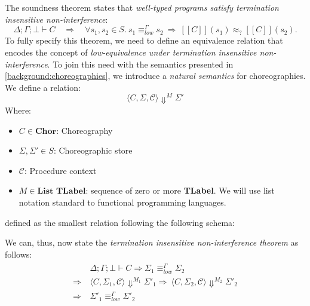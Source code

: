 \documentclass[12pt,a4paper,twoside]{book}
\newcommand{\llbracket}{[\![}
\newcommand{\rrbracket}{]\!]}
\begin{document}
The soundness theorem states that \emph{well-typed programs satisfy termination insensitive non-interference}:
\[
  \Delta;\Gamma;\bot \vdash C
  \quad\Longrightarrow\quad
  \forall s_1,s_2 \in S.\ s_1 \equiv^\Gamma_{low} s_2 \ \Rightarrow\ \llbracket C \rrbracket(s_1) \approx_? \llbracket C \rrbracket(s_2).
\]
To fully specify this theorem, we need to define an equivalence relation that encodes the concept of \emph{low-equivalence under termination insensitive non-interference}.
To join this need with the semantics presented in \ref{background:choreographies}, we introduce a \emph{natural semantics}\cite{kahn1987natural} for choreographies. We define a relation:
\begin{equation}\label{nat_sem}
\langle C, \Sigma, \mathscr{C} \rangle \Downarrow^M \Sigma'
\end{equation}
Where:
\begin{itemize}
	\item $C \in \textbf{Chor}$: Choreography
	\item $\Sigma, \Sigma' \in S$: Choreographic store
	\item $\mathscr{C}$: Procedure context
	\item $M \in \textbf{List TLabel}$: sequence of zero or more \textbf{TLabel}. We will use list notation standard to functional programming languages.
\end{itemize}
defined as the smallest relation following the following schema:

We can, thus, now state the \emph{termination insensitive non-interference theorem} as follows:
\begin{align} \label{main:def}
\begin{split}
	&\Delta;\Gamma;\bot \vdash C \Rightarrow
	\Sigma_1 \equiv^\Gamma_{low} \Sigma_2 \\ \Rightarrow\ &\langle C, \Sigma_1, \mathscr{C}\rangle \Downarrow^{M_1} \Sigma'_1
	\Rightarrow\ \langle C, \Sigma_2, \mathscr{C}\rangle \Downarrow^{M_2} \Sigma'_2 \\ \Rightarrow\ &\Sigma'_1 \equiv^\Gamma_{low} \Sigma'_2
\end{split}
\end{align}
\end{document}
